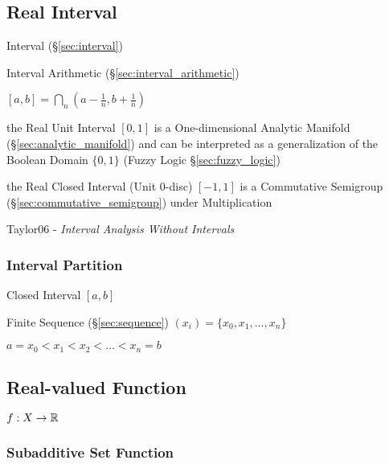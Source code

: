 \subsection{Real Interval}\label{sec:real_interval}

Interval (\S\ref{sec:interval})

Interval Arithmetic (\S\ref{sec:interval_arithmetic})

$[a,b] = \bigcap_n (a - \frac{1}{n}, b + \frac{1}{n})$

the Real Unit Interval $[0,1]$ is a One-dimensional Analytic Manifold
(\S\ref{sec:analytic_manifold}) and can be interpreted as a generalization of
the Boolean Domain $\{0, 1\}$ (Fuzzy Logic \S\ref{sec:fuzzy_logic})

the Real Closed Interval (Unit 0-disc) $[-1,1]$ is a Commutative Semigroup
(\S\ref{sec:commutative_semigroup}) under Multiplication

Taylor06 - \emph{Interval Analysis Without Intervals}



\subsubsection{Interval Partition}\label{sec:interval_partition}

Closed Interval $[a,b]$

Finite Sequence (\S\ref{sec:sequence}) $(x_i) = \{ x_0, x_1, \ldots,
x_n \}$

$a = x_0 < x_1 < x_2 < \ldots < x_n = b$



\subsection{Real-valued Function}\label{sec:real_valued}

$f : X \rightarrow \mathbb{R}$



\subsubsection{Subadditive Set Function}\label{sec:subadditive_set_function}

